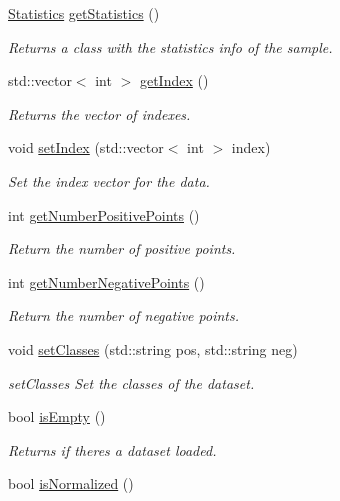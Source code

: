 \begin{DoxyCompactItemize}
\hyperlink{class_statistics}{Statistics} \hyperlink{class_data_a26376768a100f1999ef3ac15a2aa2a67}{get\+Statistics} ()
\begin{DoxyCompactList}\small\item\em Returns a class with the statistics info of the sample. \end{DoxyCompactList}\item 
std\+::vector$<$ int $>$ \hyperlink{class_data_a16685ae631c5bedc22c974980bc74c05}{get\+Index} ()
\begin{DoxyCompactList}\small\item\em Returns the vector of indexes. \end{DoxyCompactList}\item 
void \hyperlink{class_data_ab2debdff651c70d26f84c9ac20f4dee6}{set\+Index} (std\+::vector$<$ int $>$ index)
\begin{DoxyCompactList}\small\item\em Set the index vector for the data. \end{DoxyCompactList}\item 
int \hyperlink{class_data_a45a39ab2144bcdd0ac1aa67d7d08a6cc}{get\+Number\+Positive\+Points} ()
\begin{DoxyCompactList}\small\item\em Return the number of positive points. \end{DoxyCompactList}\item 
int \hyperlink{class_data_a5166e74e946c2dbac75f383d63f018ea}{get\+Number\+Negative\+Points} ()
\begin{DoxyCompactList}\small\item\em Return the number of negative points. \end{DoxyCompactList}\item 
void \hyperlink{class_data_a6dd8a8a1e1659c76e5716fc8a23a86e2}{set\+Classes} (std\+::string pos, std\+::string neg)
\begin{DoxyCompactList}\small\item\em set\+Classes Set the classes of the dataset. \end{DoxyCompactList}\item 
bool \hyperlink{class_data_a93468d3b8b2ce0f73e369e5de160534e}{is\+Empty} ()
\begin{DoxyCompactList}\small\item\em Returns if there\textquotesingle{}s a dataset loaded. \end{DoxyCompactList}\item 
bool \hyperlink{class_data_ad96fc8e9c5ec9e40b1dc6d9670eefe0c}{is\+Normalized} ()

\end{DoxyCompactItemize}
